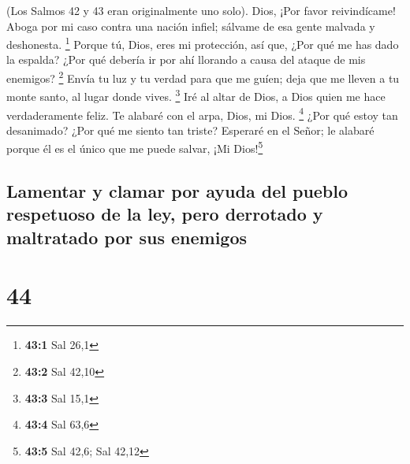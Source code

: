 (Los Salmos 42 y 43 eran originalmente uno solo).  Dios,
¡Por favor reivindícame! Aboga por mi caso contra una nación infiel;
sálvame de esa gente malvada y deshonesta. \footnote{\textbf{43:1} Sal
  26,1}  Porque tú, Dios, eres mi protección, así que,
¿Por qué me has dado la espalda? ¿Por qué debería ir por ahí llorando a
causa del ataque de mis enemigos? \footnote{\textbf{43:2} Sal 42,10}
 Envía tu luz y tu verdad para que me guíen; deja que me
lleven a tu monte santo, al lugar donde vives. \footnote{\textbf{43:3}
  Sal 15,1}  Iré al altar de Dios, a Dios quien me hace
verdaderamente feliz. Te alabaré con el arpa, Dios, mi Dios. \footnote{\textbf{43:4}
  Sal 63,6}  ¿Por qué estoy tan desanimado? ¿Por qué me
siento tan triste? Esperaré en el Señor; le alabaré porque él es el
único que me puede salvar, ¡Mi Dios!\footnote{\textbf{43:5} Sal 42,6;
  Sal 42,12}

\hypertarget{lamentar-y-clamar-por-ayuda-del-pueblo-respetuoso-de-la-ley-pero-derrotado-y-maltratado-por-sus-enemigos}{%
\subsection{Lamentar y clamar por ayuda del pueblo respetuoso de la ley,
pero derrotado y maltratado por sus
enemigos}\label{lamentar-y-clamar-por-ayuda-del-pueblo-respetuoso-de-la-ley-pero-derrotado-y-maltratado-por-sus-enemigos}}

\hypertarget{section-43}{%
\section{44}\label{section-43}}

